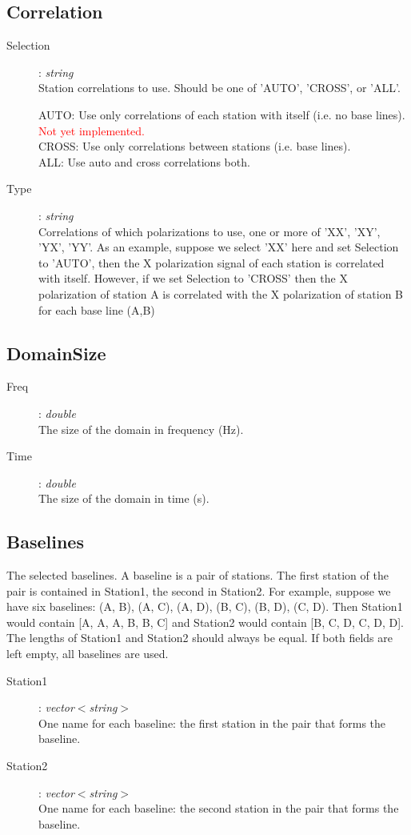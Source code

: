 \documentclass[10pt]{lofar}
\begin{document}
\subsection*{Correlation}
\label{app-correlation}
\begin{description}
\item [Selection] : \emph{string} \\
    Station correlations to use. Should be one of 'AUTO', 'CROSS', or 'ALL'.
    \par
    AUTO: Use only correlations of each station with itself (i.e. no base
    lines). \textcolor{red}{Not yet implemented.} \\ CROSS: Use only
    correlations between stations (i.e. base lines). \\ ALL: Use auto and
    cross correlations both.
\item [Type] : \emph{string} \\
    Correlations of which polarizations to use, one or more of 'XX', 'XY',
    'YX', 'YY'. As an example, suppose we select 'XX' here and set Selection
    to 'AUTO', then the X polarization signal of each station is correlated
    with itself.  However, if we set Selection to 'CROSS' then the X
    polarization of station A is correlated with the X polarization of station
    B for each base line (A,B)
\end{description}

\subsection*{DomainSize}
\label{app-domainsize}
\begin{description}
\item [Freq] : \emph{double} \\
    The size of the domain in frequency (Hz).
\item [Time] : \emph{double} \\
    The size of the domain in time (s).
\end{description}

\subsection*{Baselines}
\label{app-baselines}
The selected baselines. A baseline is a pair of stations. The first station of
the pair is contained in Station1, the second in Station2. For example,
suppose we have six baselines: (A, B), (A, C), (A, D), (B, C), (B, D), (C,
D). Then Station1 would contain [A, A, A, B, B, C] and Station2 would contain
[B, C, D, C, D, D]. The lengths of Station1 and Station2 should always be
equal. If both fields are left empty, all baselines are used.
\begin{description}
\item [Station1] : \emph{vector$<$string$>$} \\
    One name for each baseline: the first station in the pair that forms the
    baseline.
\item [Station2] : \emph{vector$<$string$>$} \\
    One name for each baseline: the second station in the pair that forms the
    baseline.
\end{description}
\end{document}

